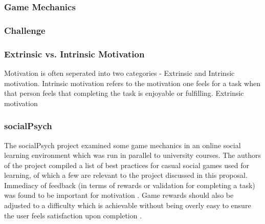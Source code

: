 \subsubsection{Game Mechanics} \label{background_gamemechanics}
\subsubsection{Challenge}
\cite{csikszentmihalyi_flow:_1991}
\subsubsection{Extrinsic vs. Intrinsic Motivation}
Motivation is often seperated into two categories - Extrinsic and Intrinsic motivation. Intrinsic motivation refers to the motivation one feels for a task when that person feels that completing the task is enjoyable or fulfilling. Extrinsic motivation 
\subsubsection{socialPsych}
The socialPsych\cite{landers_casual_2011} project examined some game mechanics
in an online social learning environment which was run in parallel to university
courses. The authors of the project compiled a list of best practices
for casual social games used for learning, of which a few are relevant to
the project discussed in this proposal. Immediacy of feedback (in terms of
rewards or validation for completing a task) was found to be important for
motivation \cite[p. 419]{landers_casual_2011}. Game rewards should also be adjusted
to a difficulty which is achievable without being overly easy to ensure the user
feels satisfaction upon completion \cite[p. 420]{landers_casual_2011}.
